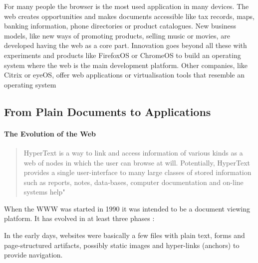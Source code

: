 For many people the browser is the most used application in many devices. 
The web creates opportunities and makes documents accessible like tax records, maps, banking information, phone directories or product catalogues.
New business models, like new ways of promoting products, selling music or movies, are developed having the web as a core part.
Innovation goes beyond all these with experiments and products like FirefoxOS or ChromeOS to build an operating system where the web is the main development platform.
Other companies, like Citrix or eyeOS, offer web applications or virtualisation tools that resemble an operating system %


%
%

\subsection{From Plain Documents to Applications}
\paragraph{The Evolution of the Web}
\begin{quote} 
HyperText is a way to link and access information of various kinds as a web of nodes in which the user can browse at will. 
Potentially, HyperText provides a single user-interface to many large classes of stored information such as reports, notes, data-bases, computer documentation and on-line systems help" \cite{BernersLee:1990}
\end{quote} 

When the \ac{WWW} was started in 1990 it was intended to be a document viewing platform.
It has evolved in at least three phases \cite{Anttonen:2011} \cite{Taivalsaari:2008}:

In the early days, websites were basically a few files with plain text, forms and page-structured artifacts, possibly static images and hyper-links (anchors) to provide navigation. 

